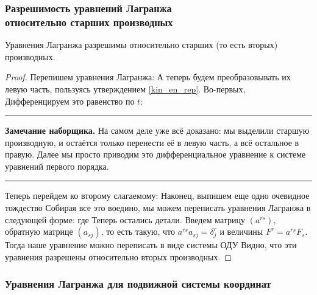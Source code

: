 \documentclass[a4paper,12pt]{article}
\newenvironment{nbb}{\par\vskip3pt\hrule\vskip3pt\textbf{\footnotesize Замечание наборщика.}\footnotesize }
{\vskip3pt\hrule\par\vskip3pt}
\begin{document}
\subsubsection{Разрешимость уравнений Лагранжа\\ относительно старших производных}

\begin{theorem}
Уравнения Лагранжа разрешимы относительно старших (то есть вторых)
производных.
\end{theorem}
\begin{proof}
Перепишем уравнения Лагранжа:
 А
теперь будем преобразовывать их левую часть, пользуясь утверждением
\ref{kin_en_rep}. Во-первых, 
Дифференцируем это равенство по $t$:
\begin{nbb}
На самом деле уже всё доказано: мы выделили старшую производную, и остаётся только перенести её
в левую часть, а всё остальное в правую. Далее мы просто приводим это дифференциальное уравнение
к системе уравнений первого порядка.
\end{nbb}
Теперь перейдем ко второму слагаемому:
Наконец, выпишем еще одно очевидное тождество
Собирая все это воедино, мы можем переписать уравнения
Лагранжа в следующей форме: 
где
 Теперь
остались детали. Введем матрицу $(a^{rs})$, обратную матрице
$(a_{sj})$, то есть такую, что $a^{rs}a_{sj}=\delta^r_j$ и величины
$F^r=a^{rs}F_s$. Тогда наше уравнение можно переписать в виде
системы ОДУ
Видно, что эти уравнения разрешены относительно вторых производных.
\end{proof}

\subsubsection{Уравнения Лагранжа для подвижной системы координат}
\end{document}
